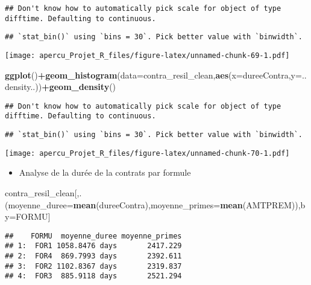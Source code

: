 \documentclass[
]{article}
\newenvironment{Shaded}{\begin{snugshade}}{\end{snugshade}}
\newcommand{\DataTypeTok}[1]{\textcolor[rgb]{0.13,0.29,0.53}{#1}}
\newcommand{\KeywordTok}[1]{\textcolor[rgb]{0.13,0.29,0.53}{\textbf{#1}}}
\newcommand{\NormalTok}[1]{#1}
\newcommand{\OperatorTok}[1]{\textcolor[rgb]{0.81,0.36,0.00}{\textbf{#1}}}
\providecommand{\tightlist}{%
  \setlength{\itemsep}{0pt}\setlength{\parskip}{0pt}}
\begin{document}
\begin{verbatim}
## Don't know how to automatically pick scale for object of type difftime. Defaulting to continuous.
\end{verbatim}

\begin{verbatim}
## `stat_bin()` using `bins = 30`. Pick better value with `binwidth`.
\end{verbatim}

\texttt{[image: apercu\_Projet\_R\_files/figure-latex/unnamed-chunk-69-1.pdf]}

\begin{Shaded}
\begin{Highlighting}[]
 \KeywordTok{ggplot}\NormalTok{()}\OperatorTok{+}\KeywordTok{geom_histogram}\NormalTok{(}\DataTypeTok{data=}\NormalTok{contra_resil_clean,}\KeywordTok{aes}\NormalTok{(}\DataTypeTok{x=}\NormalTok{dureeContra,}\DataTypeTok{y=}\NormalTok{..density..))}\OperatorTok{+}\KeywordTok{geom_density}\NormalTok{()}
\end{Highlighting}
\end{Shaded}

\begin{verbatim}
## Don't know how to automatically pick scale for object of type difftime. Defaulting to continuous.
\end{verbatim}

\begin{verbatim}
## `stat_bin()` using `bins = 30`. Pick better value with `binwidth`.
\end{verbatim}

\texttt{[image: apercu\_Projet\_R\_files/figure-latex/unnamed-chunk-70-1.pdf]}

\begin{itemize}
\tightlist
\item
  Analyse de la durée de la contrats par formule
\end{itemize}

\begin{Shaded}
\begin{Highlighting}[]
\NormalTok{contra_resil_clean[,.(}\DataTypeTok{moyenne_duree=}\KeywordTok{mean}\NormalTok{(dureeContra),}\DataTypeTok{moyenne_primes=}\KeywordTok{mean}\NormalTok{(AMTPREM)),by=FORMU]}
\end{Highlighting}
\end{Shaded}

\begin{verbatim}
##    FORMU  moyenne_duree moyenne_primes
## 1:  FOR1 1058.8476 days       2417.229
## 2:  FOR4  869.7993 days       2392.611
## 3:  FOR2 1102.8367 days       2319.837
## 4:  FOR3  885.9118 days       2521.294
\end{verbatim}
\end{document}
